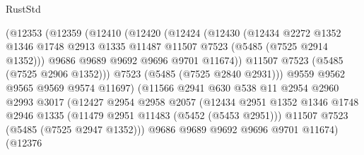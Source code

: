 \begin{lexlean}{RustStd}
\begin{coremodule}
                        (@12353
                          (@12359
                            (@12410
                              (@12420
                                (@12424
                                  (@12430
                                    (@12434
                                      @2272
                                      @1352
                                      @1346
                                      @1748
                                      @2913
                                      @1335
                                      @11487
                                      @11507
                                      @7523
                                      (@5485 (@7525 @2914 @1352)))
                                    @9686
                                    @9689
                                    @9692
                                    @9696
                                    @9701
                                    @11674))
                                @11507
                                @7523
                                (@5485 (@7525 @2906 @1352)))
                              @7523
                              (@5485 (@7525 @2840 @2931)))
                            @9559
                            @9562
                            @9565
                            @9569
                            @9574
                            @11697)
                          (@11566
                            @2941
                            @630
                            @538
                            @11
                            @2954
                            @2960
                            @2993
                            @3017
                            (@12427
                              @2954
                              @2958
                              @2057
                              (@12434
                                @2951
                                @1352
                                @1346
                                @1748
                                @2946
                                @1335
                                (@11479 @2951 @11483 (@5452 (@5453 @2951)))
                                @11507
                                @7523
                                (@5485 (@7525 @2947 @1352)))
                              @9686
                              @9689
                              @9692
                              @9696
                              @9701
                              @11674)
                            (@12376

\end{coremodule}
\end{lexlean}
